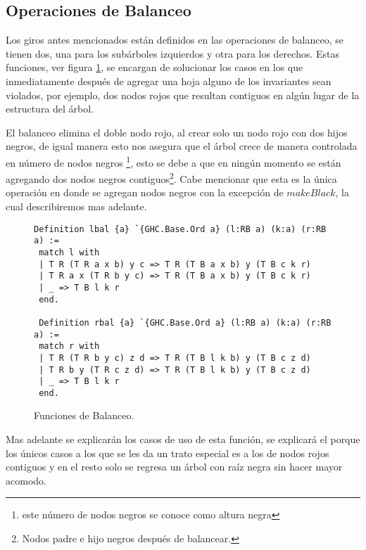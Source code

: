 \subsection{Operaciones de Balanceo}
Los giros antes mencionados están definidos en las operaciones de balanceo, se tienen dos, una para
los subárboles izquierdos y otra para los derechos. Estas funciones, ver figura
\ref{func_balanceo}, se encargan de solucionar los casos en los que inmediatamente después de
agregar una hoja alguno de los invariantes sean violados, por ejemplo, dos nodos rojos que resultan
contiguos en algún lugar de la estructura del \'arbol.

El balanceo elimina el doble nodo rojo, al crear solo un nodo rojo con dos hijos negros, de igual
manera esto nos asegura que el árbol crece de manera controlada en n\'umero de nodos negros
\footnote{este n\'umero de nodos negros se conoce como altura negra}, esto se debe a que en ningún
momento se están agregando dos nodos negros contiguos\footnote{Nodos padre e hijo negros después de
balancear.}. Cabe mencionar que esta es la única operación en donde se agregan nodos negros con la
excepción de $makeBlack$, la cual describiremos mas adelante.

\begin{figure}
\centering
\captionsetup{justification=centering}
\begin{verbatim}
Definition lbal {a} `{GHC.Base.Ord a} (l:RB a) (k:a) (r:RB a) :=
 match l with
 | T R (T R a x b) y c => T R (T B a x b) y (T B c k r)
 | T R a x (T R b y c) => T R (T B a x b) y (T B c k r)
 | _ => T B l k r
 end.

 Definition rbal {a} `{GHC.Base.Ord a} (l:RB a) (k:a) (r:RB a) :=
 match r with
 | T R (T R b y c) z d => T R (T B l k b) y (T B c z d)
 | T R b y (T R c z d) => T R (T B l k b) y (T B c z d)
 | _ => T B l k r
 end.
\end{verbatim}
\caption{Funciones de Balanceo.}
\label{func_balanceo}
\end{figure}

Mas adelante se explicar\'an los casos de uso de esta función, se explicar\'a el porque los
\'unicos casos a los que se les da un trato especial es a los de nodos rojos contiguos y en el
resto solo se regresa un \'arbol con ra\'iz negra sin hacer mayor acomodo.

